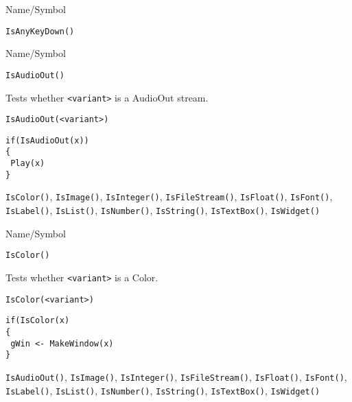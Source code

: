 \rl


\begin{desc}{Name/Symbol}
\item[Name/Symbol]	\verb+IsAnyKeyDown()+

\item[Description]	

\item[Usage]		

\item[Example]	

\item[See Also]	
\end{desc}

\rl


\begin{desc}{Name/Symbol}
\item[Name/Symbol]	\verb+IsAudioOut()+

\item[Description]	Tests whether \verb+<variant>+ is a AudioOut stream.

\item[Usage]
\begin{verbatim}
IsAudioOut(<variant>)
\end{verbatim}

\item[Example]
\begin{verbatim}
if(IsAudioOut(x))
{
 Play(x)
}
\end{verbatim}

\item[See Also] \verb+IsColor()+, \verb+IsImage()+,
  \verb+IsInteger()+, \verb+IsFileStream()+, \verb+IsFloat()+,
  \verb+IsFont()+, \verb+IsLabel()+, \verb+IsList()+,
  \verb+IsNumber()+, \verb+IsString()+, \verb+IsTextBox()+,
  \verb+IsWidget()+
\end{desc}

\rl


\begin{desc}{Name/Symbol}
\item[Name/Symbol]	\verb+IsColor()+

\item[Description]	Tests whether \verb+<variant>+ is a Color.

\item[Usage]
\begin{verbatim}
IsColor(<variant>)
\end{verbatim}

\item[Example]
\begin{verbatim}
if(IsColor(x)
{
 gWin <- MakeWindow(x)
}
\end{verbatim}

\item[See Also] \verb+IsAudioOut()+, \verb+IsImage()+,
  \verb+IsInteger()+, \verb+IsFileStream()+, \verb+IsFloat()+,
  \verb+IsFont()+, \verb+IsLabel()+, \verb+IsList()+,
  \verb+IsNumber()+, \verb+IsString()+, \verb+IsTextBox()+,
  \verb+IsWidget()+
\end{desc}

